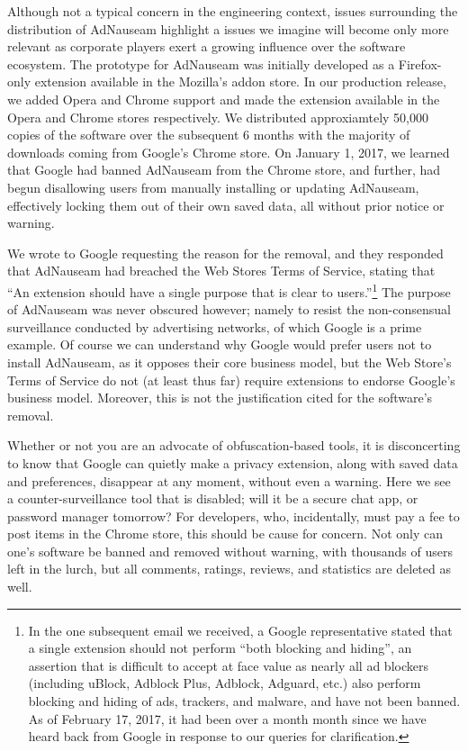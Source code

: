 \documentclass[conference]{IEEEtran}
\begin{document}
Although not a typical concern in the engineering context, issues surrounding the distribution of AdNauseam highlight a issues we imagine will become only more relevant as corporate players exert a growing influence over the software ecosystem. The prototype for AdNauseam was initially developed as a Firefox-only extension available in the Mozilla's addon store. In our production release, we added Opera and Chrome support and made the extension available in the Opera and Chrome stores respectively. We distributed approxiamtely 50,000 copies of the software over the subsequent 6 months with the majority of downloads coming from Google's Chrome store. On January 1, 2017,  we learned that Google had banned AdNauseam from the Chrome store, and further, had begun disallowing users from manually installing or updating AdNauseam, effectively locking them out of their own saved data, all without prior notice or warning.

We wrote to Google requesting the reason for the removal, and they responded that AdNauseam had breached the Web Stores Terms of Service, stating that “An extension should have a single purpose that is clear to users.”\footnote{In the one subsequent email we received, a Google representative stated that a single extension should not perform “both blocking and hiding”, an assertion that is difficult to accept at face value as nearly all ad blockers (including uBlock, Adblock Plus, Adblock, Adguard, etc.) also perform blocking and hiding of ads, trackers, and malware, and have not been banned. As of February 17, 2017, it had been over a month month since we have heard back from Google in response to our queries for clarification.} The purpose of AdNauseam was never obscured however; namely to resist the non-consensual surveillance conducted by advertising networks, of which Google is a prime example. Of course we can  understand why Google would prefer users not to install AdNauseam, as it opposes their core business model, but the Web Store's Terms of Service do not (at least thus far) require extensions to endorse Google's business model. Moreover, this is not the justification cited for the software's removal.

Whether or not you are an advocate of obfuscation-based tools, it is disconcerting to know that Google can quietly make a privacy extension, along with saved data and preferences, disappear at any moment, without even a warning. Here we see a counter-surveillance tool that is disabled; will it be a secure chat app, or password manager tomorrow? For developers, who, incidentally, must pay a fee to post items in the Chrome store, this should be cause for concern. Not only can one's software be banned and removed without warning, with thousands of users left in the lurch, but all comments, ratings, reviews, and statistics are deleted as well.
\end{document}
